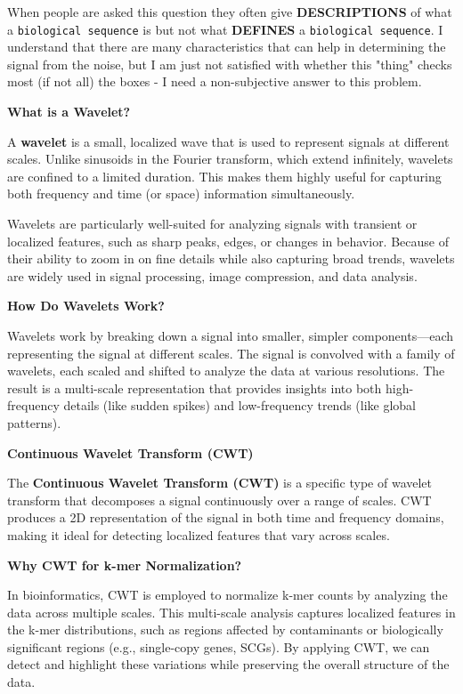 \documentclass[11pt]{report}
\begin{document}
{\begin{tcolorbox}[colback=gray!10!white, coltitle=white, colframe=gray!80!black, title=Biological Information]
	When people are asked this question they often give \textbf{DESCRIPTIONS} of what a \texttt{biological sequence} is but not what \textbf{DEFINES} a \texttt{biological sequence}. I understand that there are many characteristics that can help in determining the signal from the noise, but I am just not satisfied with whether this "thing" checks most (if not all) the boxes - I need a non-subjective answer to this problem. 
\end{tcolorbox}


\begin{tcolorbox}[label=box:Wavelets, colback=gray!10!white, coltitle=white, colframe=gray!80!black, title= Wavelets, breakable]
	\textbf{What is a Wavelet?} 
	
	A \textbf{wavelet} is a small, localized wave that is used to represent signals at different scales. Unlike sinusoids in the Fourier transform, which extend infinitely, wavelets are confined to a limited duration. This makes them highly useful for capturing both frequency and time (or space) information simultaneously.
	
	Wavelets are particularly well-suited for analyzing signals with transient or localized features, such as sharp peaks, edges, or changes in behavior. Because of their ability to zoom in on fine details while also capturing broad trends, wavelets are widely used in signal processing, image compression, and data analysis.
	
	\textbf{How Do Wavelets Work?}
	
	Wavelets work by breaking down a signal into smaller, simpler components—each representing the signal at different scales. The signal is convolved with a family of wavelets, each scaled and shifted to analyze the data at various resolutions. The result is a multi-scale representation that provides insights into both high-frequency details (like sudden spikes) and low-frequency trends (like global patterns).
	
	\textbf{Continuous Wavelet Transform (CWT)}
	
	The \textbf{Continuous Wavelet Transform (CWT)} is a specific type of wavelet transform that decomposes a signal continuously over a range of scales. CWT produces a 2D representation of the signal in both time and frequency domains, making it ideal for detecting localized features that vary across scales.
	
	\textbf{Why CWT for k-mer Normalization?}
	
	In bioinformatics, CWT is employed to normalize k-mer counts by analyzing the data across multiple scales. This multi-scale analysis captures localized features in the k-mer distributions, such as regions affected by contaminants or biologically significant regions (e.g., single-copy genes, SCGs). By applying CWT, we can detect and highlight these variations while preserving the overall structure of the data.
	

\end{tcolorbox}}
\end{document}
